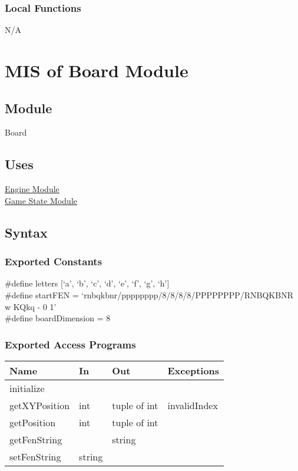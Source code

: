 \documentclass[12pt, titlepage]{article}
\begin{document}
    \subsubsection{Local Functions}
    N/A

    \newpage

\section{MIS of Board Module} \label{mBoard}

    \subsection{Module}
    Board

    \subsection{Uses}
    \hyperref[mEngine]{Engine Module}\\
    \hyperref[mGame]{Game State Module}

    \subsection{Syntax}
    \subsubsection{Exported Constants}
        \#define letters [`a', `b', `c', `d', `e', `f', `g', `h']\\
        \#define startFEN = `rnbqkbnr/pppppppp/8/8/8/8/PPPPPPPP/RNBQKBNR w KQkq - 0 1'\\
        \#define boardDimension = 8

    \subsubsection{Exported Access Programs}
        \begin{center}
        \begin{tabular}{p{4.5cm} p{4cm} p{3cm} p{2.5cm}}
        \hline
        \textbf{Name} & \textbf{In} & \textbf{Out} & \textbf{Exceptions} \\
        \hline
        initialize & & & \\
        \hline
        getXYPosition & int & tuple of int & invalidIndex\\
        \hline
        getPosition & int & tuple of int & \\
        \hline
        getFenString & & string & \\
        \hline
        setFenString & string & & \\
        \hline
        \end{tabular}
        \end{center}
\end{document}

